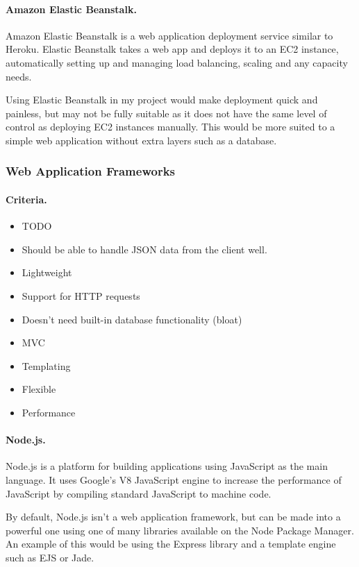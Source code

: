 \documentclass[a4paper, 12pt]{article}
\begin{document}
\paragraph{Amazon Elastic Beanstalk.}
Amazon Elastic Beanstalk is a web application deployment service similar to Heroku. Elastic Beanstalk takes a web app and deploys it to an EC2 instance, automatically setting up and managing load balancing, scaling and any capacity needs.


Using Elastic Beanstalk in my project would make deployment quick and painless, but may not be fully suitable as it does not have the same level of control as deploying EC2 instances manually. This would be more suited to a simple web application without extra layers such as a database.


\subsubsection{Web Application Frameworks}
\paragraph{Criteria.}
\begin{itemize}
\item{TODO}
\item{Should be able to handle JSON data from the client well.}
\item{Lightweight}
\item{Support for HTTP requests}
\item{Doesn’t need built-in database functionality (bloat)}
\item{MVC}
\item{Templating}
\item{Flexible}
\item{Performance}
\end{itemize}

\paragraph{Node.js.}
Node.js is a platform for building applications using JavaScript as the main language. It uses Google's V8 JavaScript engine to increase the performance of JavaScript by compiling standard JavaScript to machine code.


By default, Node.js isn't a web application framework, but can be made into a powerful one using one of many libraries available on the Node Package Manager. An example of this would be using the Express library and a template engine such as EJS or Jade.
\end{document}
